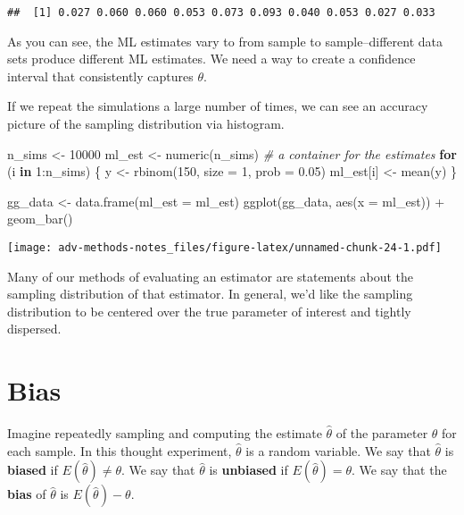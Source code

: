 \documentclass[
]{book}
\newenvironment{Shaded}{\begin{snugshade}}{\end{snugshade}}
\newcommand{\AttributeTok}[1]{\textcolor[rgb]{0.77,0.63,0.00}{#1}}
\newcommand{\CommentTok}[1]{\textcolor[rgb]{0.56,0.35,0.01}{\textit{#1}}}
\newcommand{\ControlFlowTok}[1]{\textcolor[rgb]{0.13,0.29,0.53}{\textbf{#1}}}
\newcommand{\DecValTok}[1]{\textcolor[rgb]{0.00,0.00,0.81}{#1}}
\newcommand{\FloatTok}[1]{\textcolor[rgb]{0.00,0.00,0.81}{#1}}
\newcommand{\FunctionTok}[1]{\textcolor[rgb]{0.00,0.00,0.00}{#1}}
\newcommand{\NormalTok}[1]{#1}
\newcommand{\OtherTok}[1]{\textcolor[rgb]{0.56,0.35,0.01}{#1}}
\newcommand{\SpecialCharTok}[1]{\textcolor[rgb]{0.00,0.00,0.00}{#1}}
\begin{document}
\begin{verbatim}
##  [1] 0.027 0.060 0.060 0.053 0.073 0.093 0.040 0.053 0.027 0.033
\end{verbatim}

As you can see, the ML estimates vary to from sample to
sample--different data sets produce different ML estimates. We need a
way to create a confidence interval that consistently captures
\(\theta\).

If we repeat the simulations a large number of times, we can see an
accuracy picture of the sampling distribution via histogram.

\begin{Shaded}
\begin{Highlighting}[]
\NormalTok{n\_sims }\OtherTok{\textless{}{-}} \DecValTok{10000}
\NormalTok{ml\_est }\OtherTok{\textless{}{-}} \FunctionTok{numeric}\NormalTok{(n\_sims)  }\CommentTok{\# a container for the estimates}
\ControlFlowTok{for}\NormalTok{ (i }\ControlFlowTok{in} \DecValTok{1}\SpecialCharTok{:}\NormalTok{n\_sims) \{}
\NormalTok{  y }\OtherTok{\textless{}{-}} \FunctionTok{rbinom}\NormalTok{(}\DecValTok{150}\NormalTok{, }\AttributeTok{size =} \DecValTok{1}\NormalTok{, }\AttributeTok{prob =} \FloatTok{0.05}\NormalTok{)}
\NormalTok{  ml\_est[i] }\OtherTok{\textless{}{-}} \FunctionTok{mean}\NormalTok{(y)}
\NormalTok{\}}

\NormalTok{gg\_data }\OtherTok{\textless{}{-}} \FunctionTok{data.frame}\NormalTok{(}\AttributeTok{ml\_est =}\NormalTok{ ml\_est)}
\FunctionTok{ggplot}\NormalTok{(gg\_data, }\FunctionTok{aes}\NormalTok{(}\AttributeTok{x =}\NormalTok{ ml\_est)) }\SpecialCharTok{+} 
  \FunctionTok{geom\_bar}\NormalTok{()}
\end{Highlighting}
\end{Shaded}

\texttt{[image: adv-methods-notes\_files/figure-latex/unnamed-chunk-24-1.pdf]}

Many of our methods of evaluating an estimator are statements about the
sampling distribution of that estimator. In general, we'd like the
sampling distribution to be centered over the true parameter of interest
and tightly dispersed.

\hypertarget{bias}{%
\section{Bias}\label{bias}}

Imagine repeatedly sampling and computing the estimate \(\hat{\theta}\)
of the parameter \(\theta\) for each sample. In this thought experiment,
\(\hat{\theta}\) is a random variable. We say that \(\hat{\theta}\) is
\textbf{biased} if \(E(\hat{\theta}) \neq \theta\). We say that
\(\hat{\theta}\) is \textbf{unbiased} if \(E(\hat{\theta}) = \theta\).
We say that the \textbf{bias} of \(\hat{\theta}\) is
\(E(\hat{\theta}) - \theta\).
\end{document}
